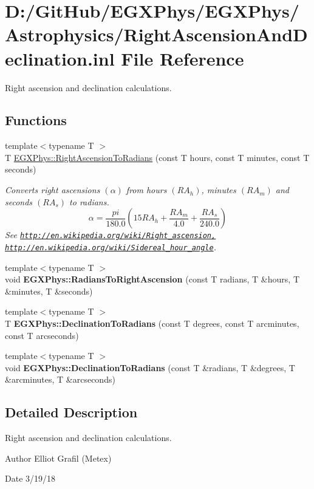 \hypertarget{_right_ascension_and_declination_8inl}{}\section{D\+:/\+Git\+Hub/\+E\+G\+X\+Phys/\+E\+G\+X\+Phys/\+Astrophysics/\+Right\+Ascension\+And\+Declination.inl File Reference}
\label{_right_ascension_and_declination_8inl}


Right ascension and declination calculations.  


\subsection*{Functions}
\begin{DoxyCompactItemize}
\item 
{\footnotesize template$<$typename T $>$ }\\T \mbox{\hyperlink{group___e_g_x_phys-_right_ascension_and_declination_ga25cb93de046663967af01d6687c423ae}{E\+G\+X\+Phys\+::\+Right\+Ascension\+To\+Radians}} (const T hours, const T minutes, const T seconds)
\begin{DoxyCompactList}\small\item\em Converts right ascensions $(\alpha)$ from hours $(RA_h)$, minutes $(RA_m)$ and seconds $(RA_s)$ to radians. \[\alpha=\frac{pi}{180.0}(15 RA_h + \frac{RA_m}{4.0} + \frac{RA_s}{240.0})\] See \href{http://en.wikipedia.org/wiki/Right_ascension,}{\tt http\+://en.\+wikipedia.\+org/wiki/\+Right\+\_\+ascension,} \href{http://en.wikipedia.org/wiki/Sidereal_hour_angle}{\tt http\+://en.\+wikipedia.\+org/wiki/\+Sidereal\+\_\+hour\+\_\+angle}. \end{DoxyCompactList}\item 
{\footnotesize template$<$typename T $>$ }\\void {\bfseries E\+G\+X\+Phys\+::\+Radians\+To\+Right\+Ascension} (const T radians, T \&hours, T \&minutes, T \&seconds)
\item 
{\footnotesize template$<$typename T $>$ }\\T {\bfseries E\+G\+X\+Phys\+::\+Declination\+To\+Radians} (const T degrees, const T arcminutes, const T arcseconds)
\item 
{\footnotesize template$<$typename T $>$ }\\void {\bfseries E\+G\+X\+Phys\+::\+Declination\+To\+Radians} (const T \&radians, T \&degrees, T \&arcminutes, T \&arcseconds)
\end{DoxyCompactItemize}


\subsection{Detailed Description}
Right ascension and declination calculations. 

\begin{DoxyAuthor}{Author}
Elliot Grafil (Metex) 
\end{DoxyAuthor}
\begin{DoxyDate}{Date}
3/19/18 
\end{DoxyDate}
